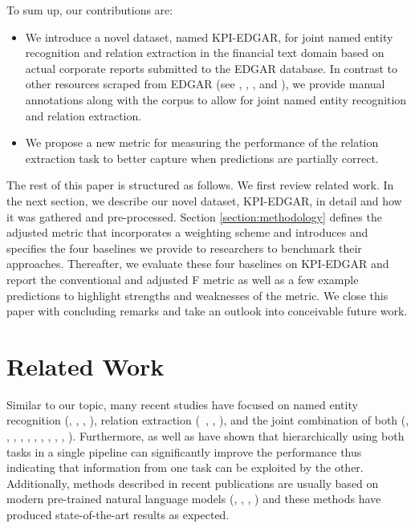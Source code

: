 \documentclass[conference, table]{IEEEtran}
\newcommand{\1} {\mathbbm{1}}
\begin{document}
To sum up, our contributions are:
\begin{itemize}
    \item We introduce a novel dataset, named KPI-EDGAR, for joint named entity recognition and relation extraction in the financial text domain based on actual corporate reports submitted to the EDGAR database. In contrast to other resources scraped from EDGAR (see \cite{han2016mining}, \cite{ashraf2017scraping}, \cite{loukas2021edgar}, and \cite{lonare2021edgar}), we provide manual annotations along with the corpus to allow for joint named entity recognition and relation extraction.
    \item We propose a new metric for measuring the performance of the relation extraction task to better capture when predictions are partially correct.
\end{itemize}

The rest of this paper is structured as follows. We first review related work. In the next section, we describe our novel dataset, KPI-EDGAR, in detail and how it was gathered and pre-processed. 
Section \ref{section:methodology} defines the adjusted metric that incorporates a weighting scheme and introduces and specifies the four baselines we provide to researchers to benchmark their approaches. Thereafter, we evaluate these four baselines on KPI-EDGAR and report the conventional and adjusted F metric as well as a few example predictions to highlight strengths and weaknesses of the metric. We close this paper with concluding remarks and take an outlook into conceivable future work.

\section{Related Work}
Similar to our topic, many recent studies have focused on named entity recognition (\cite{lester2020constrained}, \cite{ushio2021t}, \cite{wang2021improving},  \cite{wang2021automated}), relation extraction (~\cite{xu2021entity}, \cite{zeng2020double}, \cite{zhangdocument}), and the joint combination of both (\cite{li2014incremental}, \cite{pappu2017lightweight}, \cite{eberts2019span}, \cite{liang2020bond}, \cite{shen2021trigger}, \cite{wang2020two}, \cite{ye2021pack}, \cite{zhong2021frustratingly}, \cite{tran2021improved}, \cite{hang2022joint}, \cite{savary2022relation}). Furthermore, \cite{fundel2007relex} as well as \cite{gurulingappa2012extraction} have shown that hierarchically using both tasks in a single pipeline can significantly improve the performance thus indicating that information from one task can be exploited by the other.
Additionally, methods described in recent publications are usually based on modern pre-trained natural language models (\cite{devlin2018bert}, \cite{liu2019roberta}, \cite{radford2018improving}, \cite{radford2019language}) and these methods have produced state-of-the-art results as expected.
\end{document}
